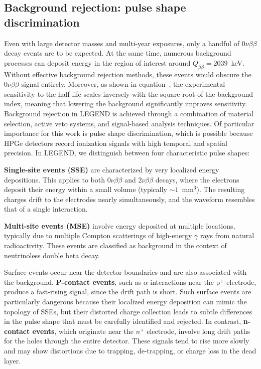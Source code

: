 \subsection{Background rejection: pulse shape discrimination}
\label{sec:02_PSD}

Even with large detector masses and multi-year exposures, only a handful of $0 \nu \beta \beta$ decay events are to be expected. At the same time, numerous background processes can deposit energy in the region of interest around $Q_{\beta \beta} = 2039$~keV.
Without effective background rejection methods, these events would obscure the $0\nu\beta\beta$ signal entirely. Moreover, as shown in equation~, the experimental sensitivity to the half-life scales inversely with the square root of the background index, meaning that lowering the background significantly improves sensitivity. 
Background rejection in LEGEND is achieved through a combination of material selection, active veto systems, and signal-based analysis techniques. Of particular importance for this work is pulse shape discrimination, which is possible because HPGe detectors record ionization signals with high temporal and spatial precision.
In LEGEND, we distinguish between four characteristic pulse shapes: 


\textbf{Single-site events (SSE)} are characterized by very localized energy depositions. This applies to both $0 \nu \beta \beta$ and $2 \nu \beta \beta$ decays, where the electrons deposit their energy within a small volume (typically $\sim 1$~mm$^3$). The resulting charges drift to the electrodes nearly simultaneously, and the waveform resembles that of a single interaction.

\textbf{Multi-site events (MSE)} involve energy deposited at multiple locations, typically due to multiple Compton scatterings of high-energy $\gamma$ rays from natural radioactivity. These events are classified as background in the context of neutrinoless double beta decay. 

Surface events occur near the detector boundaries and are also associated with the background. \textbf{P-contact events}, such as $\alpha$ interactions near the p$^{+}$ electrode, produce a fast-rising signal, since the drift path is short. Such surface events are particularly dangerous because their localized energy deposition can mimic the topology of SSEs, but their distorted charge collection leads to subtle differences in the pulse shape that must be carefully identified and rejected. 
In contrast, \textbf{n-contact events}, which originate near the $n^{+}$ electrode, involve long drift paths for the holes through the entire detector. These signals tend to rise more slowly and may show distortions due to trapping, de-trapping, or charge loss in the dead layer.


